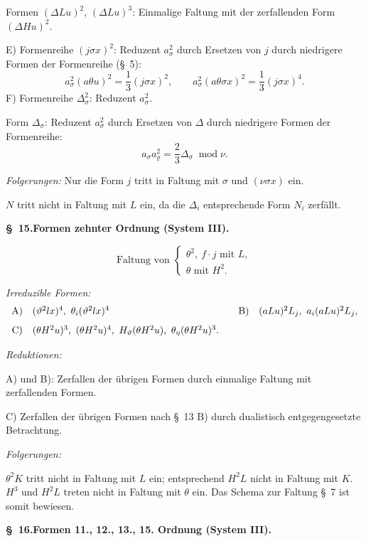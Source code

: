 \documentclass[11pt]{article}
\newcommand{\A}{\Delta}
\newcommand{\R}{\varrho}
\newcommand{\modu}[1]{\;\operatorname{mod} #1}
\begin{document}
Formen $(\A Lu)^2$, $(\A Lu)^3$: Einmalige Faltung mit der zerfallenden Form $(\A Hu)^2$.

E) Formenreihe $(j\sigma x)^2$: Reduzent $a_\sigma^2$ durch Ersetzen von $j$ durch niedrigere Formen der Formenreihe (\S\ 5):
\[
a_\sigma^2(a\theta u)^2=\frac13(j\sigma x)^2,
\qquad
a_\sigma^2(a\theta\sigma x)^2=\frac13(j\sigma x)^4.
\]
F) Formenreihe $\A_\sigma^2$: Reduzent $a_\sigma^2$.

Form $\A_\sigma$: Reduzent $a_\sigma^2$ durch Ersetzen von $\A$ durch niedrigere Formen der Formenreihe:
\[
a_\sigma a_\R^2=\frac23\A_\sigma\modu{\nu}.
\]

\noindent\emph{Folgerungen:} Nur die Form $j$ tritt in Faltung mit $\sigma$ und $(\nu\sigma x)$ ein.

$N$ tritt nicht in Faltung mit $L$ ein, da die $\A_i$ entsprechende Form $N_i$ zerfällt.

\begin{center}
\textbf{\S\ 15.\quad Formen zehnter Ordnung (System III).}
\end{center}
\[
\text{Faltung von }\left\{\begin{array}{l}
\theta^2,
\ f\cdot j\text{ mit }L,\\
\theta\text{ mit }H^2.
\end{array}\right.
\]

\noindent\emph{Irreduzible Formen:}
\[
\begin{array}{c@{\quad}l@{\qquad}c@{\quad}l}
\text{A)}&(\vartheta^2lx)^4,
\ \theta_i(\vartheta^2lx)^4&
\text{B)}&(aLu)^2L_j,
\ a_i(aLu)^2L_j,\\[0.8em]
\text{C)}&(\theta H^2u)^3,
\ (\theta H^2u)^4,
\ H_\vartheta(\theta H^2u),
\ \theta_\eta(\theta H^2u)^3.
\end{array}
\]

\noindent\emph{Reduktionen:}

A) und B): Zerfallen der übrigen Formen durch einmalige Faltung mit zerfallenden Formen.

C) Zerfallen der übrigen Formen nach \S\ 13 B) durch dualistisch entgegengesetzte Betrachtung.

\noindent\emph{Folgerungen:}

$\theta^2K$ tritt nicht in Faltung mit $L$ ein; entsprechend $H^2L$ nicht in Faltung mit $K$. $H^3$ und $H^2L$ treten nicht in Faltung mit $\theta$ ein. Das Schema zur Faltung \S\ 7 ist somit bewiesen.

\begin{center}
\textbf{\S\ 16.\quad Formen 11., 12., 13., 15. Ordnung (System III).}
\end{center}
\end{document}
